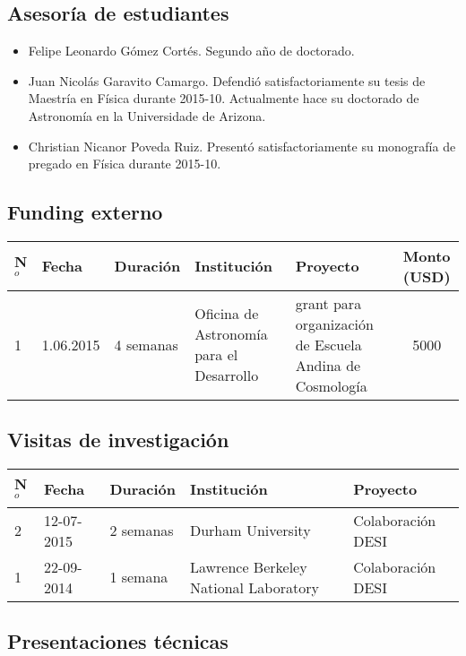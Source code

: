 \documentclass{article}
\begin{document}
\subsection{Asesor\'ia de estudiantes}

\begin{itemize}
\item{Felipe Leonardo G\'omez Cort\'es. Segundo a\~no de doctorado.}
\item{Juan Nicol\'as Garavito Camargo. Defendi\'o satisfactoriamente
  su tesis de Maestr\'ia en F\'isica durante 2015-10. Actualmente hace su doctorado de
  Astronom\'ia en la Universidade de Arizona.}
\item{Christian Nicanor Poveda Ruiz. Present\'o satisfactoriamente su
  monograf\'ia de pregado en F\'isica durante 2015-10.}
\end{itemize}

\subsection{Funding externo}
\begin{tabular}{l l l p{3.5cm} p{2.3cm} c}\hline
N$^{o}$ & Fecha & Duraci\'on & Instituci\'on & Proyecto & Monto (USD)\\\hline
1 & 1.06.2015 & 4 semanas & Oficina de Astronom\'ia para el Desarrollo
& grant para organizaci\'on de Escuela Andina de Cosmolog\'ia & 5000
\\\hline 
\end{tabular}

\subsection{Visitas de investigaci\'on}

\begin{tabular}{l l l p{3.5cm} p{5.0cm}}\hline
N$^{o}$ & Fecha & Duraci\'on & Instituci\'on & Proyecto \\\hline
2 & 12-07-2015 & 2 semanas & Durham University & Colaboraci\'on DESI\\
1 & 22-09-2014 & 1 semana & Lawrence Berkeley National
Laboratory & Colaboraci\'on DESI\\\hline
\end{tabular}

\subsection{Presentaciones t\'ecnicas}
\end{document}
